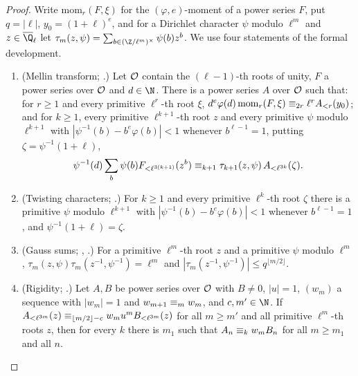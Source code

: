 \begin{proof}
Write $\mathrm{mom}_r(F,\xi)$ for the $(\varphi,e)$-moment of a power series $F$, put $q=|\ell|$, $y_0=(1+\ell)^e$, and for a Dirichlet
character $\psi$ modulo $\ell^m$ and $z\in\katoQlb$ let $\tau_m(z,\psi)=\sum_{b\in(\Z/\ell^m)^\times}\psi(b)z^b$. We use four statements of the
formal development.
\begin{enumerate}[label=(\Alph*)]
\item (Mellin transform; .) Let $\mathcal{O}$ contain the $(\ell-1)$-th roots of unity, $F$ a power
  series over $\mathcal{O}$ and $d\in\N$. There is a power series $A$ over $\mathcal{O}$ such that: for $r\ge1$ and every primitive $\ell^r$-th root
  $\xi$, $d^e\varphi(d)\,\mathrm{mom}_r(F,\xi)\equiv_{2r}\ell^rA_{<r}(y_0)$; and for $k\ge1$, every primitive $\ell^{k+1}$-th root $z$ and
  every primitive $\psi$ modulo $\ell^{k+1}$ with $|\psi^{-1}(b)-b^e\varphi(b)|<1$ whenever $b^{\ell-1}=1$, putting $\zeta=\psi^{-1}(1+\ell)$,
  \[
    \psi^{-1}(d)\sum_b\psi(b)F_{<\ell^{3(k+1)}}(z^b)\equiv_{k+1}\tau_{k+1}(z,\psi)\,A_{<\ell^{3k}}(\zeta).
  \]
\item (Twisting characters; .) For $k\ge1$ and every primitive $\ell^k$-th root
  $\zeta$ there is a primitive $\psi$ modulo $\ell^{k+1}$ with $|\psi^{-1}(b)-b^e\varphi(b)|<1$ whenever $b^{\ell-1}=1$, and
  $\psi^{-1}(1+\ell)=\zeta$.
\item (Gauss sums; ,
  .) For a primitive $\ell^m$-th root $z$ and a primitive $\psi$ modulo
  $\ell^m$, $\tau_m(z,\psi)\tau_m(z^{-1},\psi^{-1})=\ell^m$ and $|\tau_m(z^{-1},\psi^{-1})|\le q^{\lfloor m/2\rfloor}$.
\item (Rigidity; .) Let $A,B$ be power series over $\mathcal{O}$
  with $B\ne0$, $|u|=1$, $(w_m)$ a sequence with $|w_m|=1$ and $w_{m+1}\equiv_{m}w_m$, and $c,m'\in\N$. If
  $A_{<\ell^{3m}}(z)\equiv_{\lfloor m/2\rfloor-c}w_mu^mB_{<\ell^{3m}}(z)$ for all $m\ge m'$ and all primitive $\ell^m$-th roots $z$, then for
  every $k$ there is $m_1$ such that $A_n\equiv_{k}w_mB_n$ for all $m\ge m_1$ and all $n$.
\end{enumerate}


\end{proof}
